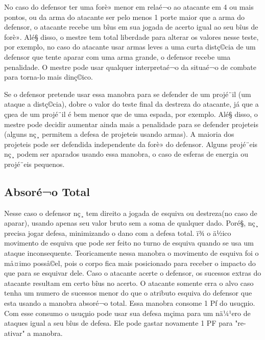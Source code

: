 No caso do defensor ter uma forè» menor em relaé¬o ao atacante em 4 ou mais pontos, ou da arma do atacante ser pelo menos 1 porte maior que a arma do defensor, o atacante recebe um bîus em sua jogada de acerto igual ao seu bîus de forè». Alé§ disso, o mestre tem total liberdade para alterar os valores nesse teste, por exemplo, no caso do atacante usar armas leves a uma curta distç©cia de um defensor que tente aparar com uma arma grande, o defensor recebe uma penalidade. O mestre pode usar qualquer interpretaé¬o da situaé¬o de combate para torna-lo mais dinç©ico.

	
Se o defensor pretende usar essa manobra para se defender de um projé¨il (um ataque a distç©cia), dobre o valor do teste final da destreza do atacante, já que a çµea de um projé¨il é bem menor que de uma espada, por exemplo. Alé§ disso, o mestre pode decidir aumentar ainda mais a penalidade para se defender projeteis (alguns nç¸ permitem a defesa de projeteis usando armas). A maioria dos projeteis pode ser defendida independente da forè» do defensor. Alguns projé¨eis nç¸ podem ser aparados usando essa manobra, o caso de esferas de energia ou projé¨eis pequenos.
	
\subsection{Absoré¬o Total}

Nesse caso o defensor nç¸ tem direito a jogada de esquiva ou destreza(no caso de aparar), usando apenas seu valor bruto sem a soma de qualquer dado. Poré§, nç¸ precisa jogar defesa, minimizando o dano com a defesa total. ï¾ o ä½ico movimento de esquiva que pode ser feito no turno de esquiva quando se usa um ataque inconsequente. Teoricamente nessa manobra o movimento de esquiva foi o må¤imo posså©el, pois o corpo fica mais posicionado para receber o impacto do que para se esquivar dele. Caso o atacante acerte o defensor, os sucessos extras do atacante resultam em certo bîus no acerto. O atacante somente erra o alvo caso tenha um numero de sucessos menor do que o atributo esquiva do defensor que esta usando a manobra absoré¬o total. Essa manobra consome 1 Pf do usuçµio. Com esse consumo o usuçµio pode usar sua defesa mçima para um nä¼¹ero de ataques igual a seu bîus de defesa. Ele pode gastar novamente 1 PF para "re-ativar" a manobra.
 
